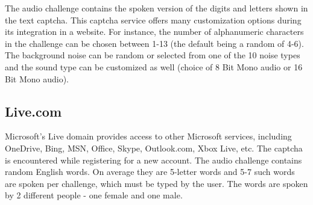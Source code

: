 The audio challenge contains the spoken version of the digits and letters shown in the text captcha.
This captcha service offers many customization options during its integration in a website. For instance, 
the number of alphanumeric characters in the challenge can be chosen between
1-13 (the default being a random of 4-6). The background noise can be random or selected from one of 
the 10 noise types and the sound type can be customized as well (choice of 8 Bit Mono audio or 16 Bit 
Mono audio). 

\subsection{Live.com}

Microsoft's Live domain provides access to other Microsoft services, including
 OneDrive, Bing, MSN, Office, Skype, Outlook.com, Xbox Live, etc. The captcha is 
 encountered while registering for a new account. The audio challenge contains random English 
 words. On average they are 5-letter words and 5-7 such words are spoken per challenge, which must be typed by the user.
The words are spoken by 2 different people - one female and one male.
